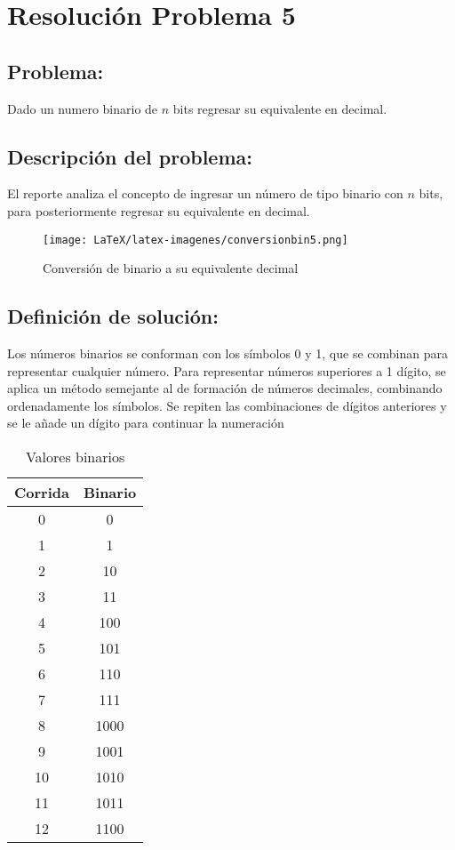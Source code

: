 \section{Resolución Problema 5}
\subsection{Problema:}
Dado un numero binario de $n$ bits regresar su equivalente en decimal.

\subsection{\textbf{Descripción del problema:}}

El reporte analiza el concepto de ingresar un número de tipo binario con $n$ bits, para posteriormente regresar su equivalente en decimal.

\begin{figure}[h!]
    \centering
    \texttt{[image: LaTeX/latex-imagenes/conversionbin5.png]}
    \caption{Conversión de binario a su equivalente decimal}
    \label{fig:GraficaEcuacionRecta}
\end{figure}

\subsection{\textbf{Definición de solución:}}

Los números binarios se conforman con los símbolos 0 y 1, que se combinan para representar cualquier número. 
Para representar números superiores a 1 dígito, se aplica un método semejante al de formación de números decimales, combinando ordenadamente los símbolos. Se repiten las combinaciones de dígitos anteriores y se le añade un dígito para continuar la numeración

\begin{table}[h]
     \centering
     \caption{Valores binarios}
     
     \begin{tabular}{|c|c|}
     \hline
        Corrida & Binario \\
        \hline
        0  & 0 \\
        \hline
        1  & 1 \\
        \hline
        2  & 10 \\
        \hline
        3  & 11 \\
        \hline
        4  & 100 \\
        \hline
        5  & 101 \\
        \hline
        6  & 110 \\
        \hline
        7  & 111 \\
        \hline
        8  & 1000 \\
        \hline
        9  & 1001 \\
        \hline
        10  & 1010 \\
        \hline
        11  & 1011 \\
        \hline
        12  & 1100 \\
        \hline
     \end{tabular}
     \label{tab:my_label}
 \end{table}

